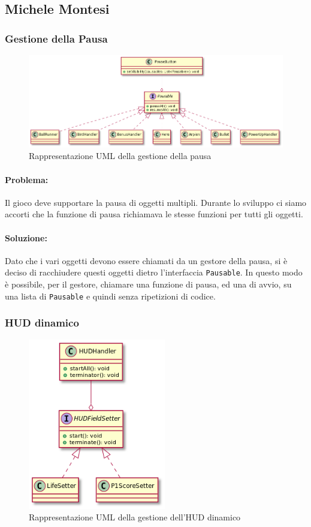 \documentclass[a4paper,12pt]{report}
\begin{document}
\newpage
\subsection{Michele Montesi}
\subsubsection{Gestione della Pausa}
\begin{figure}[H]
    \centering{}
    \includegraphics[width=15cm]{img/pause.png}
    \caption{Rappresentazione UML della gestione della pausa}
\end{figure}

\paragraph{Problema:} Il gioco deve supportare la pausa di oggetti multipli. Durante lo sviluppo ci siamo accorti che la funzione di pausa richiamava le stesse funzioni per tutti gli oggetti.

\paragraph{Soluzione:} Dato che i vari oggetti devono essere chiamati da un gestore della pausa, si è deciso di racchiudere questi oggetti dietro l’interfaccia \texttt{Pausable}. In questo modo è possibile, per il gestore, chiamare una funzione di pausa, ed una di avvio, su una lista di \texttt{Pausable} e quindi senza ripetizioni di codice.

\newpage
\subsubsection{HUD dinamico}
\begin{figure}[H]
    \centering
    \includegraphics[width=6cm]{img/hud.png}
    \caption{Rappresentazione UML della gestione dell'HUD dinamico}
\end{figure}
\end{document}
